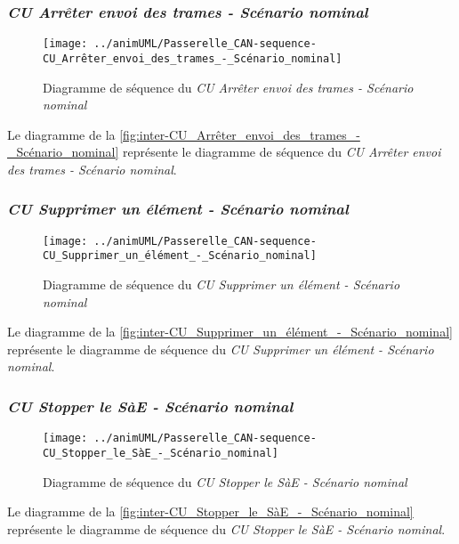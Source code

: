 \subsubsection{\emph{CU Arrêter envoi des trames - Scénario nominal}}
\begin{figure}[H]
	\centering
	\texttt{[image: ../animUML/Passerelle\_CAN-sequence-CU\_Arrêter\_envoi\_des\_trames\_-\_Scénario\_nominal]}
	\caption{Diagramme de séquence du \emph{CU Arrêter envoi des trames - Scénario nominal}}
	\label{fig:inter-CU_Arrêter_envoi_des_trames_-_Scénario_nominal}
\end{figure}
Le diagramme de la \autoref{fig:inter-CU_Arrêter_envoi_des_trames_-_Scénario_nominal} représente le diagramme de séquence du \emph{CU Arrêter envoi des trames - Scénario nominal}.


\subsubsection{\emph{CU Supprimer un élément - Scénario nominal}}
\begin{figure}[H]
	\centering
	\texttt{[image: ../animUML/Passerelle\_CAN-sequence-CU\_Supprimer\_un\_élément\_-\_Scénario\_nominal]}
	\caption{Diagramme de séquence du \emph{CU Supprimer un élément - Scénario nominal}}
	\label{fig:inter-CU_Supprimer_un_élément_-_Scénario_nominal}
\end{figure}
Le diagramme de la \autoref{fig:inter-CU_Supprimer_un_élément_-_Scénario_nominal} représente le diagramme de séquence du \emph{CU Supprimer un élément - Scénario nominal}.


\subsubsection{\emph{CU Stopper le SàE - Scénario nominal}}
\begin{figure}[H]
	\centering
	\texttt{[image: ../animUML/Passerelle\_CAN-sequence-CU\_Stopper\_le\_SàE\_-\_Scénario\_nominal]}
	\caption{Diagramme de séquence du \emph{CU Stopper le SàE - Scénario nominal}}
	\label{fig:inter-CU_Stopper_le_SàE_-_Scénario_nominal}
\end{figure}
Le diagramme de la \autoref{fig:inter-CU_Stopper_le_SàE_-_Scénario_nominal} représente le diagramme de séquence du \emph{CU Stopper le SàE - Scénario nominal}.



